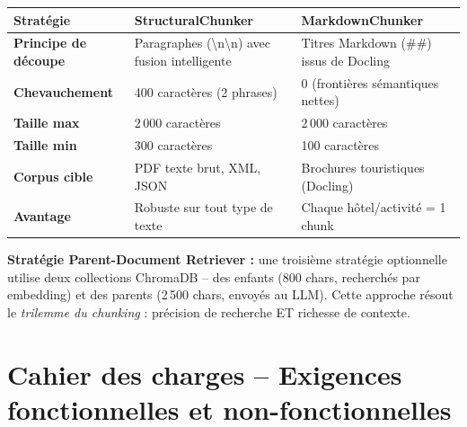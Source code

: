 \documentclass[12pt,a4paper]{report}
\begin{document}
\begin{center}
\renewcommand{\arraystretch}{1.5}
\begin{tabularx}{\linewidth}{>{\bfseries}p{3.2cm} X X}
  \toprule
  \rowcolor{rowblue}
  \textbf{Strat\'{e}gie} & \textbf{StructuralChunker} & \textbf{MarkdownChunker} \\
  \midrule
  Principe de d\'{e}coupe & Paragraphes (\textbackslash n\textbackslash n) avec fusion intelligente & Titres Markdown (\#\#) issus de Docling \\
  Chevauchement & 400 caract\`{e}res (2 phrases) & 0 (fronti\`{e}res s\'{e}mantiques nettes) \\
  Taille max & 2\,000 caract\`{e}res & 2\,000 caract\`{e}res \\
  Taille min & 300 caract\`{e}res & 100 caract\`{e}res \\
  Corpus cible & PDF texte brut, XML, JSON & Brochures touristiques (Docling) \\
  Avantage & Robuste sur tout type de texte & Chaque h\^{o}tel/activit\'{e} = 1 chunk \\
  \bottomrule
\end{tabularx}
\end{center}

\vspace{0.5em}
\begin{notebox}
\textbf{Strat\'{e}gie Parent-Document Retriever :} une troisi\`{e}me strat\'{e}gie optionnelle
utilise deux collections ChromaDB -- des \og{}enfants\fg{} (800 chars, recherch\'{e}s par embedding)
et des \og{}parents\fg{} (2\,500 chars, envoy\'{e}s au LLM). Cette approche r\'{e}sout le
\textit{trilemme du chunking} : pr\'{e}cision de recherche ET richesse de contexte.
\end{notebox}

\section{Cahier des charges -- Exigences fonctionnelles et non-fonctionnelles}
\end{document}
